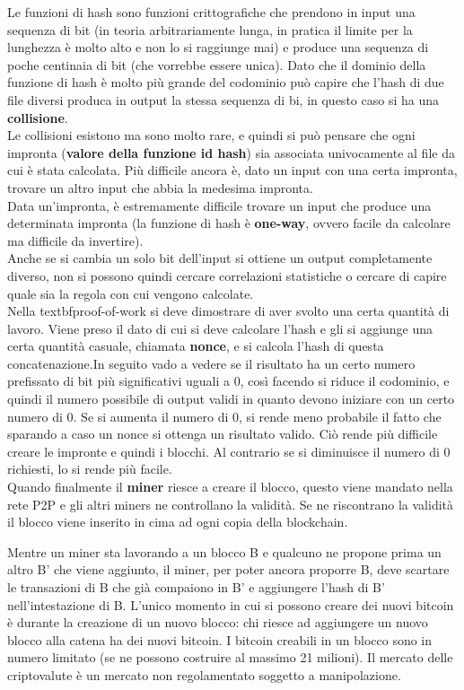 Le funzioni di hash sono funzioni crittografiche che prendono in input una sequenza di bit (in teoria arbitrariamente lunga, in pratica il limite per la lunghezza è molto alto e non lo si raggiunge mai) e produce una sequenza di poche centinaia di bit (che vorrebbe essere unica). Dato che il dominio della funzione di hash è molto più grande del codominio può capire che l’hash di due file diversi produca in output la stessa sequenza di bi, in questo caso si ha una \textbf{collisione}. \\

Le collisioni esistono ma sono molto rare, e quindi si può pensare che ogni impronta (\textbf{valore della funzione id hash}) sia associata univocamente al file da cui è stata calcolata. Più difficile ancora è, dato un input con una certa impronta, trovare un altro input che abbia la medesima impronta. \\
Data un’impronta, è estremamente difficile trovare un input che produce una determinata impronta (la funzione di hash è \textbf{one-way}, ovvero facile da calcolare ma difficile da invertire). \\ 
Anche se si cambia un solo bit dell’input si ottiene un output completamente diverso, non si possono quindi cercare correlazioni statistiche o cercare di capire quale sia la regola con cui vengono calcolate. \\

Nella textbf{proof-of-work} si deve dimostrare di aver svolto una certa quantità di lavoro. Viene preso il dato di cui si deve calcolare l’hash e gli si aggiunge una certa quantità casuale, chiamata \textbf{nonce}, e si calcola l’hash di questa concatenazione.In seguito vado a vedere se il risultato ha un certo numero prefissato di bit più significativi uguali a 0, così facendo si riduce il codominio, e quindi il numero possibile di output validi in quanto devono iniziare con un certo numero di 0. Se si aumenta il numero di 0, si rende meno probabile il fatto che sparando a caso un nonce si ottenga un risultato valido. Ciò rende più difficile creare le impronte e quindi i blocchi. Al contrario se si diminuisce il numero di 0 richiesti, lo si rende più facile. \\
Quando finalmente il \textbf{miner} riesce a creare il blocco, questo viene mandato nella rete P2P e gli altri miners ne controllano la validità. Se ne riscontrano la validità il blocco viene inserito in cima ad ogni copia della blockchain.

Mentre un miner sta lavorando a un blocco B e qualcuno ne propone prima un altro B’ che viene aggiunto, il miner, per poter ancora proporre B, deve scartare le transazioni di B che già compaiono in B’ e aggiungere l’hash di B’ nell’intestazione di B. L’unico momento in cui si possono creare dei nuovi bitcoin è durante la creazione di un nuovo blocco: chi riesce ad aggiungere un nuovo blocco alla catena ha dei nuovi bitcoin. I bitcoin creabili in un blocco sono in numero limitato (se ne possono costruire al massimo 21 milioni). Il mercato delle criptovalute è un mercato non regolamentato soggetto a manipolazione.

